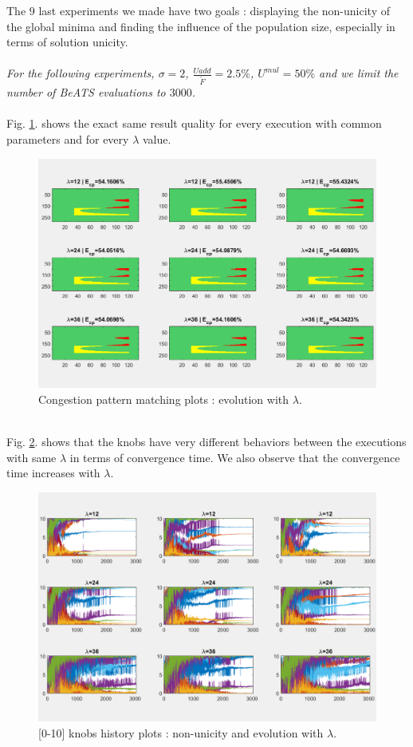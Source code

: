 The $9$ last experiments we made have two goals : displaying the non-unicity of the global minima and finding the influence of the population size, especially in terms of solution unicity.\\
\\
\emph{For the following experiments, $\sigma=2$, $\frac{U{add}}{\widetilde{F}}=2.5\% $, $U^{mul}=50\% $ and we limit the number of BeATS evaluations to $3000$.} \\
\\
Fig. \ref{fig:lambdacp}. shows the exact same result quality for every execution with common parameters and for every $\lambda$ value.\\
\begin{figure}[h]
	\label{fig:lambdacp}
	\caption{Congestion pattern matching plots : evolution with $\lambda$.}
	\includegraphics[width=7in]{figures/results_figures/lambda/cp_lambda_all.png}
\end{figure}
\\
Fig. \ref{fig:lambdaknobs}. shows that the knobs have very different behaviors between the executions with same $\lambda$ in terms of convergence time. We also observe that the convergence time increases with $\lambda$.\\
\begin{figure}[h]
	\label{fig:lambdaknobs}
	\caption{[0-10] knobs history plots : non-unicity and evolution with $\lambda$.}
	\includegraphics[width=7in]{figures/results_figures/lambda/knobs_lambda_all.png}
\end{figure}
